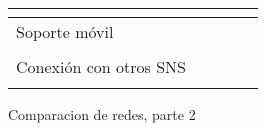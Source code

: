 \begin{landscape}
\begin{table}
\begin{center}
{\begin{tabular}{|l|llll|}
     & \multicolumn{1}{c}{} & \multicolumn{1}{c}{} & \multicolumn{1}{c}{} & \multicolumn{1}{c|}{} \\ 
    \hline
    Soporte móvil & \multicolumn{1}{c}{} & \multicolumn{1}{c}{} & \multicolumn{1}{c}{} & \multicolumn{1}{c|}{} \\ 
     & \multicolumn{1}{c}{} & \multicolumn{1}{c}{} & \multicolumn{1}{c}{} & \multicolumn{1}{c|}{} \\ 
    \hline
    Conexión con otros SNS & \multicolumn{1}{c}{} & \multicolumn{1}{c}{} & \multicolumn{1}{c}{} & \multicolumn{1}{c|}{} \\ 
     & \multicolumn{1}{c}{} & \multicolumn{1}{c}{} & \multicolumn{1}{c}{} & \multicolumn{1}{c|}{} \\ 
    \hline
  \end{tabular}
  }
    \end{center}
\end{table}
  
  \newpage
  
  \begin{table}
  \caption{Comparacion de redes, parte 2}
  \label{tab:comparacion_redes_2}

  \begin{center}
  

\end{center}
\end{table}
\end{landscape}
